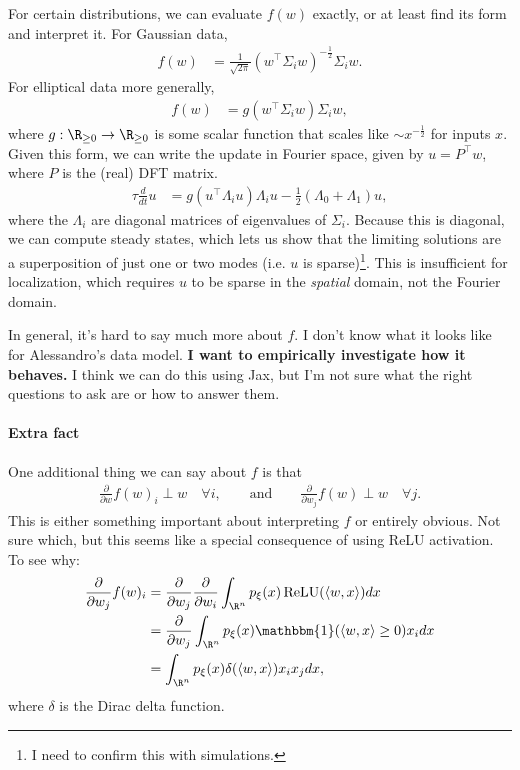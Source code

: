 \documentclass{article}
\begin{document}
For certain distributions, we can evaluate $f(w)$ exactly, or at least find its form and interpret it.
For Gaussian data,
\begin{align*}
  f(w) &= \frac{1}{\sqrt{2\pi}} (w^\top \Sigma_i w)^{-\frac{1}{2}} \Sigma_i w.
\end{align*}
For elliptical data more generally,
\begin{align*}
  f(w) &= g(w^\top \Sigma_i w) \Sigma_i w,
\end{align*}
where $g : \R_{\geq 0} \to \R_{\geq 0}$ is some scalar function that scales like $\sim x^{-\frac{1}{2}}$ for inputs $x$.
Given this form, we can write the update in Fourier space, given by $u = P^\top w$, where $P$ is the (real) DFT matrix.
\begin{align}
  \tau \frac{d}{dt} u
  &= g(u^\top \Lambda_i u) \Lambda_i u - \frac{1}{2} ( \Lambda_0 + \Lambda_1 ) u,
\end{align}
where the $\Lambda_i$ are diagonal matrices of eigenvalues of $\Sigma_i$.
Because this is diagonal, we can compute steady states, which lets us show that the limiting solutions are a superposition of just one or two modes (i.e. $u$ is sparse)\footnote{I need to confirm this with simulations.}.
This is insufficient for localization, which requires $u$ to be sparse in the \emph{spatial} domain, not the Fourier domain.

In general, it's hard to say much more about $f$.
I don't know what it looks like for Alessandro's data model.
\textbf{I want to empirically investigate how it behaves.}
I think we can do this using Jax, but I'm not sure what the right questions to ask are or how to answer them.


\paragraph*{Extra fact}
One additional thing we can say about $f$ is that
\begin{align*}
  \frac{\partial}{\partial w} f(w)_i \perp w \quad \forall i,
  \qquad \text{and} \qquad
  \frac{\partial}{\partial w_j} f(w) \perp w \quad \forall j.
\end{align*}
This is either something important about interpreting $f$ or entirely obvious.
Not sure which, but this seems like a special consequence of using ReLU activation.
To see why:
\begin{align*}
  \frac{\partial}{\partial w_j} f(w)_i
  &= \frac{\partial}{\partial w_j} \frac{\partial}{\partial w_i} \int_{\R^n} p_{\xi}(x) \operatorname{ReLU}(\langle w, x \rangle) dx \\
  &= \frac{\partial}{\partial w_j} \int_{\R^n} p_{\xi}(x) \mathbbm{1}(\langle w, x \rangle \geq 0) x_i dx \\
  &= \int_{\R^n} p_{\xi}(x) \delta(\langle w, x \rangle) x_i x_j dx,
\end{align*}
where $\delta$ is the Dirac delta function.
\end{document}
